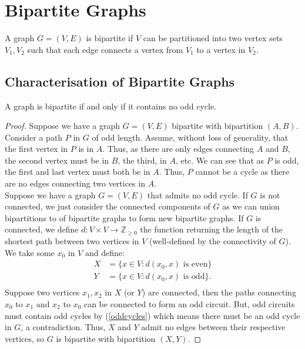\section{Bipartite Graphs}

A graph $G = (V, E)$ is bipartite if $V$ can be partitioned into
two vertex sets $V_1, V_2$ such that each edge connects a vertex
from $V_1$ to a vertex in $V_2$.

\subsection{Characterisation of Bipartite Graphs}

A graph is bipartite if and only if it contains no odd cycle.

\begin{proof}
    Suppose we have a graph $G = (V, E)$ bipartite with bipartition
    $(A, B)$. Consider a path $P$ in $G$ of odd length.
    Assume, without loss of generality, that the first
    vertex in $P$ is in $A$. Thus, as there are only edges
    connecting $A$ and $B$, the second vertex must be in $B$,
    the third, in $A$, etc. We can see that as $P$ is odd,
    the first and last vertex must both be in $A$. Thus,
    $P$ cannot be a cycle as there are no edges connecting
    two vertices in $A$.
    \\[\baselineskip]
    Suppose we have a graph $G = (V, E)$ that admits no odd
    cycle. If $G$ is not connected, we just consider the
    connected components of $G$ as we can union bipartitions
    to of bipartite graphs to form new bipartite graphs.
    If $G$ is connected, we define 
    $d : V \times V \to \mathbb{Z}_{\geq 0}$
    the function returning the length of the shortest path
    between two vertices in $V$ (well-defined by the connectivity
    of $G$). We take some $x_0$ in $V$ and define: \begin{align*}
        X &= \{x \in V : d(x_0, x) \text{ is even}\} \\
        Y &= \{x \in V : d(x_0, x) \text{ is odd}\}. \\
    \end{align*} Suppose two vertices $x_1, x_2$ in $X$ 
    (or $Y$) are connected, then the paths connecting
    $x_0$ to $x_1$ and $x_2$ to $x_0$ can be connected to
    form an odd circuit. But, odd circuits must contain odd cycles
    by (\ref{oddcycles}) which means there must be an odd cycle in $G$, a contradiction.
    Thus, $X$ and $Y$ admit no edges between their respective
    vertices, so $G$ is bipartite with bipartition $(X, Y)$.
 
\end{proof}

